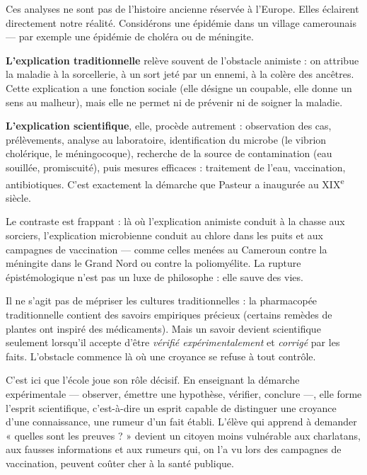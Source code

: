 \documentclass[11pt]{article}
\newcommand{\cle}[1]{{\popxbold\color{popdark}#1}}
\begin{document}
Ces analyses ne sont pas de l'histoire ancienne réservée à l'Europe. Elles éclairent directement notre réalité. Considérons une épidémie dans un village camerounais — par exemple une épidémie de choléra ou de méningite.

\textbf{L'explication traditionnelle} relève souvent de l'obstacle \cle{animiste} : on attribue la maladie à la sorcellerie, à un sort jeté par un ennemi, à la colère des ancêtres. Cette explication a une fonction sociale (elle désigne un coupable, elle donne un sens au malheur), mais elle ne permet ni de prévenir ni de soigner la maladie.

\textbf{L'explication scientifique}, elle, procède autrement : observation des cas, prélèvements, analyse au laboratoire, identification du microbe (le vibrion cholérique, le méningocoque), recherche de la source de contamination (eau souillée, promiscuité), puis mesures efficaces : traitement de l'eau, vaccination, antibiotiques. C'est exactement la démarche que Pasteur a inaugurée au XIX\textsuperscript{e} siècle.

Le contraste est frappant : là où l'explication animiste conduit à la chasse aux sorciers, l'explication microbienne conduit au chlore dans les puits et aux campagnes de vaccination — comme celles menées au Cameroun contre la méningite dans le Grand Nord ou contre la poliomyélite. La rupture épistémologique n'est pas un luxe de philosophe : elle sauve des vies.

\begin{attention}
Il ne s'agit pas de mépriser les cultures traditionnelles : la pharmacopée traditionnelle contient des savoirs empiriques précieux (certains remèdes de plantes ont inspiré des médicaments). Mais un savoir devient scientifique seulement lorsqu'il accepte d'être \emph{vérifié expérimentalement} et \emph{corrigé} par les faits. L'obstacle commence là où une croyance se refuse à tout contrôle.
\end{attention}

C'est ici que l'\cle{école} joue son rôle décisif. En enseignant la démarche expérimentale — observer, émettre une hypothèse, vérifier, conclure —, elle forme l'esprit scientifique, c'est-à-dire un esprit capable de distinguer une croyance d'une connaissance, une rumeur d'un fait établi. L'élève qui apprend à demander « quelles sont les preuves ? » devient un citoyen moins vulnérable aux charlatans, aux fausses informations et aux rumeurs qui, on l'a vu lors des campagnes de vaccination, peuvent coûter cher à la santé publique.
\end{document}
